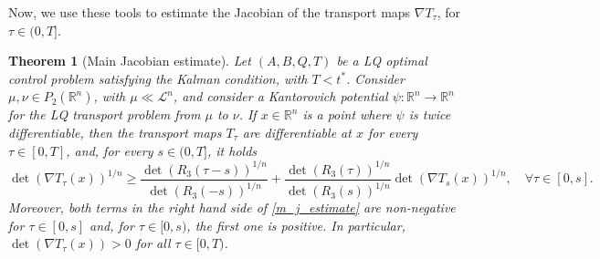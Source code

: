 \documentclass[reqno]{amsart}
\theoremstyle{plain}
\newtheorem{thm}{Theorem}[section]
\theoremstyle{definition}
\theoremstyle{remark}
\begin{document}
		Now, we use these tools to estimate the Jacobian of the transport maps $\nabla T_\tau$, for $\tau\in(0,T]$. 
		\begin{thm}[Main Jacobian estimate]\label{main_jacobian_estimate} Let $(A,B,Q,T)$ be a LQ optimal control problem satisfying the Kalman condition, with $T<t^*$.
			Consider $\mu,\nu\in P_2(\mathbb{R}^n)$, with $\mu\ll\mathscr{L}^n$, and consider a Kantorovich potential $\psi:\mathbb{R}^n\to\mathbb{R}^n$ for the LQ transport problem from $\mu$ to $\nu$. If $x\in\mathbb{R}^n$ is a point where $\psi$ is twice differentiable, then the transport maps $T_\tau$ are differentiable at $x$ for every $\tau\in[0,T]$, and, for every $s\in(0,T]$, it holds
			\begin{equation}\label{m_j_estimate}
				\det(\nabla T_\tau(x))^{1/n}\geq\frac{\det(R_3(\tau-s))^{1/n}}{\det(R_3(-s))^{1/n}}+\frac{\det(R_3(\tau))^{1/n}}{\det(R_3(s))^{1/n}}\det(\nabla T_s(x))^{1/n},\quad\forall \tau\in[0,s].
			\end{equation}
			Moreover, both terms in the right hand side of \eqref{m_j_estimate} are non-negative for $\tau\in[0,s]$ and, for $\tau\in[0,s)$, the first one is positive. In particular, $\det(\nabla T_\tau(x))>0$ for all $\tau\in[0,T)$.
		\end{thm}
\end{document}
